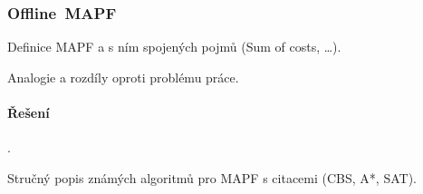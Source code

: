 \subsubsection{Offline~MAPF}\label{subsubsec:offline_mapf}

Definice MAPF a s ním spojených pojmů (Sum of costs, \ldots).

Analogie a rozdíly oproti problému práce.

%
%

\paragraph{Řešení~}\label{par:reseni_offline_mapf}

.

Stručný popis známých algoritmů pro MAPF s citacemi (CBS, A*, SAT).


